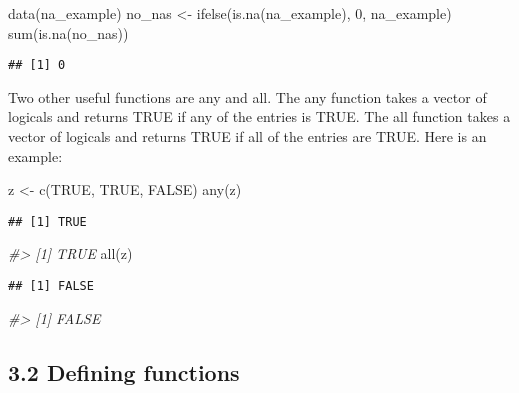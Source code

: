 \documentclass[
]{article}
\newenvironment{Shaded}{\begin{snugshade}}{\end{snugshade}}
\newcommand{\CommentTok}[1]{\textcolor[rgb]{0.56,0.35,0.01}{\textit{#1}}}
\newcommand{\ConstantTok}[1]{\textcolor[rgb]{0.00,0.00,0.00}{#1}}
\newcommand{\DecValTok}[1]{\textcolor[rgb]{0.00,0.00,0.81}{#1}}
\newcommand{\FunctionTok}[1]{\textcolor[rgb]{0.00,0.00,0.00}{#1}}
\newcommand{\NormalTok}[1]{#1}
\newcommand{\OtherTok}[1]{\textcolor[rgb]{0.56,0.35,0.01}{#1}}
\begin{document}
\begin{Shaded}
\begin{Highlighting}[]
\FunctionTok{data}\NormalTok{(na\_example)}
\NormalTok{no\_nas }\OtherTok{\textless{}{-}} \FunctionTok{ifelse}\NormalTok{(}\FunctionTok{is.na}\NormalTok{(na\_example), }\DecValTok{0}\NormalTok{, na\_example) }
\FunctionTok{sum}\NormalTok{(}\FunctionTok{is.na}\NormalTok{(no\_nas))}
\end{Highlighting}
\end{Shaded}

\begin{verbatim}
## [1] 0
\end{verbatim}

Two other useful functions are any and all. The any function takes a
vector of logicals and returns TRUE if any of the entries is TRUE. The
all function takes a vector of logicals and returns TRUE if all of the
entries are TRUE. Here is an example:

\begin{Shaded}
\begin{Highlighting}[]
\NormalTok{z }\OtherTok{\textless{}{-}} \FunctionTok{c}\NormalTok{(}\ConstantTok{TRUE}\NormalTok{, }\ConstantTok{TRUE}\NormalTok{, }\ConstantTok{FALSE}\NormalTok{)}
\FunctionTok{any}\NormalTok{(z)}
\end{Highlighting}
\end{Shaded}

\begin{verbatim}
## [1] TRUE
\end{verbatim}

\begin{Shaded}
\begin{Highlighting}[]
\CommentTok{\#\textgreater{} [1] TRUE}
\FunctionTok{all}\NormalTok{(z)}
\end{Highlighting}
\end{Shaded}

\begin{verbatim}
## [1] FALSE
\end{verbatim}

\begin{Shaded}
\begin{Highlighting}[]
\CommentTok{\#\textgreater{} [1] FALSE}
\end{Highlighting}
\end{Shaded}

\hypertarget{defining-functions}{%
\subsection{3.2 Defining functions}\label{defining-functions}}
\end{document}
